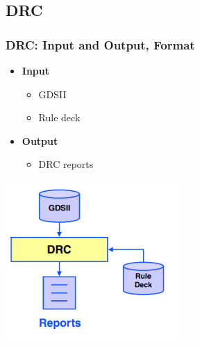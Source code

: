 \documentclass[compress]{beamer}
\begin{document}
\subsection[DRC]{DRC}
\begin{frame}
	\frametitle{DRC: Input and Output, Format}
	\begin{itemize}
		\item \textbf{Input}
			\begin{itemize}
			\item GDSII
			\item Rule deck
		\end{itemize}
		\item \textbf{Output}
		\begin{itemize}
		\item DRC reports
	\end{itemize}
	\end{itemize}
\begin{center}
	\includegraphics[width=0.5\textwidth]{DRC}
\end{center}
\end{frame}
\end{document}
